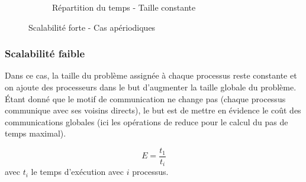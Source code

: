 \begin{figure}[!ht]
\begin{subfigure}[b]{0.5\textwidth}
    \caption{\label{fig:strong_aper_const}Répartition du temps - Taille constante}
  \end{subfigure}
  \caption{\label{fig:bench_strong_aper}Scalabilité forte - Cas apériodiques}
\end{figure}




\subsubsection{Scalabilité faible}\label{sec:scal-weak}
Dans ce cas, la taille du problème assignée à chaque processus reste constante et on ajoute des processeurs dans le but d'augmenter la taille globale du problème. Étant donné que le motif de communication ne change pas (chaque processus communique avec ses voisins directs), le but est de mettre en évidence le coût des communications globales (ici les opérations de reduce pour le calcul du pas de temps maximal).


$$E=\frac{t_1}{t_i}$$ avec $t_i$ le temps d'exécution avec $i$ processus.




